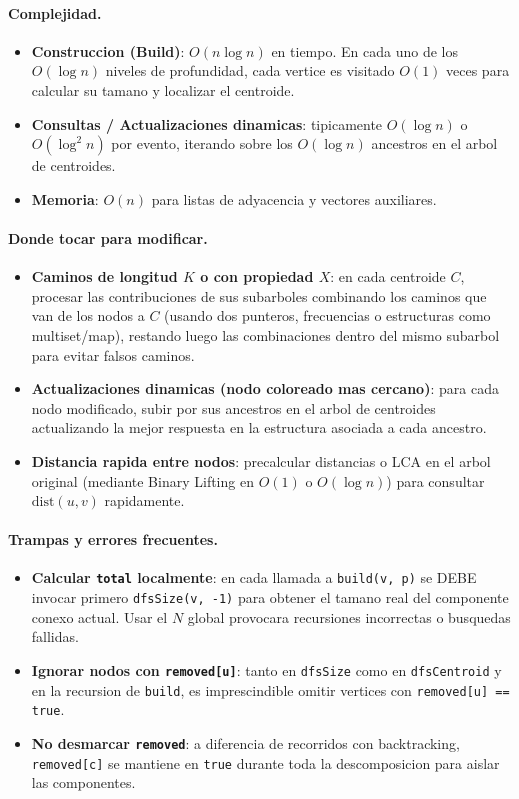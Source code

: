 \paragraph{Complejidad.}
\begin{itemize}\setlength\itemsep{0pt}
	\item \textbf{Construccion (Build)}: $O(n \log n)$ en tiempo. En cada uno de los $O(\log n)$ niveles de profundidad, cada vertice es visitado $O(1)$ veces para calcular su tamano y localizar el centroide.
	\item \textbf{Consultas / Actualizaciones dinamicas}: tipicamente $O(\log n)$ o $O(\log^2 n)$ por evento, iterando sobre los $O(\log n)$ ancestros en el arbol de centroides.
	\item \textbf{Memoria}: $O(n)$ para listas de adyacencia y vectores auxiliares.
\end{itemize}

\paragraph{Donde tocar para modificar.}
\begin{itemize}\setlength\itemsep{0pt}
	\item \textbf{Caminos de longitud $K$ o con propiedad $X$}: en cada centroide $C$, procesar las contribuciones de sus subarboles combinando los caminos que van de los nodos a $C$ (usando dos punteros, frecuencias o estructuras como multiset/map), restando luego las combinaciones dentro del mismo subarbol para evitar falsos caminos.
	\item \textbf{Actualizaciones dinamicas (nodo coloreado mas cercano)}: para cada nodo modificado, subir por sus ancestros en el arbol de centroides actualizando la mejor respuesta en la estructura asociada a cada ancestro.
	\item \textbf{Distancia rapida entre nodos}: precalcular distancias o LCA en el arbol original (mediante Binary Lifting en $O(1)$ o $O(\log n)$) para consultar $\text{dist}(u, v)$ rapidamente.
\end{itemize}

\paragraph{Trampas y errores frecuentes.}
\begin{itemize}\setlength\itemsep{0pt}
	\item \textbf{Calcular \texttt{total} localmente}: en cada llamada a \verb|build(v, p)| se DEBE invocar primero \verb|dfsSize(v, -1)| para obtener el tamano real del componente conexo actual. Usar el $N$ global provocara recursiones incorrectas o busquedas fallidas.
	\item \textbf{Ignorar nodos con \texttt{removed[u]}}: tanto en \verb|dfsSize| como en \verb|dfsCentroid| y en la recursion de \verb|build|, es imprescindible omitir vertices con \verb|removed[u] == true|.
	\item \textbf{No desmarcar \texttt{removed}}: a diferencia de recorridos con backtracking, \verb|removed[c]| se mantiene en \verb|true| durante toda la descomposicion para aislar las componentes.
\end{itemize}

